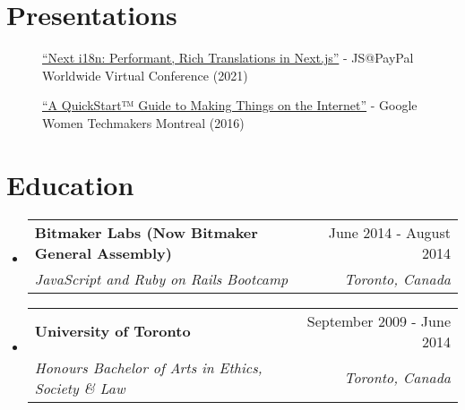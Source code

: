 \documentclass[letterpaper,10.8pt]{article}
\makeatletter
\newcommand{\education}[4]{
  \vspace{0pt}\item[]
    \begin{tabular*}{1\textwidth}{l@{\extracolsep{\fill}}r}
      \textbf{#1} & #2 \\
      \textit{\small#3} & \textit{\small #4} \\
    \end{tabular*}\vspace{-4pt}
}
\newcommand{\educationStart}{\begin{itemize}[leftmargin=0pt]}
\newcommand{\resumeSubHeadingListEnd}{\end{itemize}}
\makeatother
\begin{document}
\section{Presentations}
\begin{description}
\item[] {\href{https://youtu.be/tq9MfIG-VXw?t=14526}{“Next i18n: Performant, Rich Translations in Next.js”} - JS@PayPal Worldwide Virtual Conference (2021)}
\item[] {\href{https://www.youtube.com/watch?v=6EHbfAmA_0c}{“A QuickStart™ Guide to Making Things on the Internet”} - Google Women Techmakers Montreal (2016)}
\end{description}

\section{Education}
  \educationStart
    \education
      {Bitmaker Labs (Now Bitmaker General Assembly)}{June 2014 - August 2014}
      {JavaScript and Ruby on Rails Bootcamp}{Toronto, Canada}
    \education
      {University of Toronto}{September 2009 - June 2014}
      {Honours Bachelor of Arts in Ethics, Society \& Law}{Toronto, Canada}
    \vspace{-4px}
  \resumeSubHeadingListEnd



\end{document}
